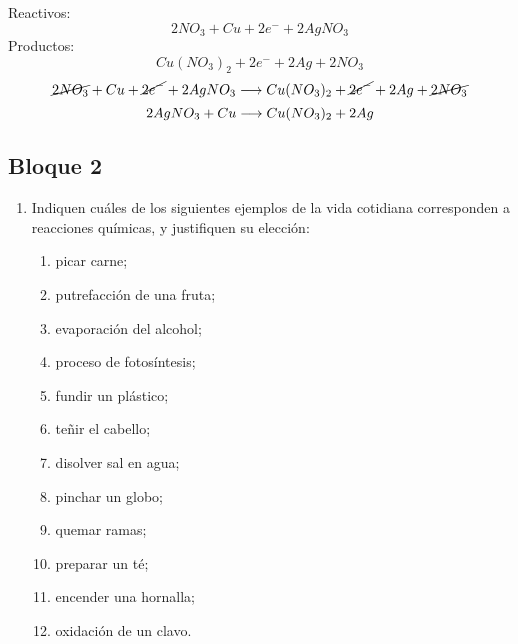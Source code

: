 \documentclass[../practica.root.tex]{subfiles}
\begin{document}
\begin{enumerate}
\begin{enumerate}

                    Reactivos:
                    \[ 2 NO_3 + Cu + 2 e^- + 2 AgNO_3 \]
                    Productos:
                    \[ Cu(NO_3)_2 + 2 e^- + 2 Ag + 2 NO_3 \]
                    \[ \cancel{2 NO_3} + Cu + \cancel{2 e^-} + 2 AgNO_3 \longrightarrow{} Cu(NO_3)_2 + \cancel{2 e^-} + 2 Ag + \cancel{2 NO_3} \]
                    \[ 2 AgNO_3 + Cu \longrightarrow{} Cu(NO_3)_2 + 2 Ag \]
          \end{enumerate}
\end{enumerate}
\subsection{Bloque 2}
\begin{enumerate}
    \item Indiquen cuáles de los siguientes ejemplos de la vida cotidiana corresponden a reacciones
          químicas, y justifiquen su elección:
          \begin{enumerate}
              \item picar carne;
              \item putrefacción de una fruta; \checkmark
              \item evaporación del alcohol;
              \item proceso de fotosíntesis; \checkmark
              \item fundir un plástico;
              \item teñir el cabello; \checkmark %
              \item disolver sal en agua; %
              \item pinchar un globo;
              \item quemar ramas; \checkmark
              \item preparar un té;
              \item encender una hornalla; \checkmark
              \item oxidación de un clavo. \checkmark
          \end{enumerate}


\end{enumerate}
\end{document}
